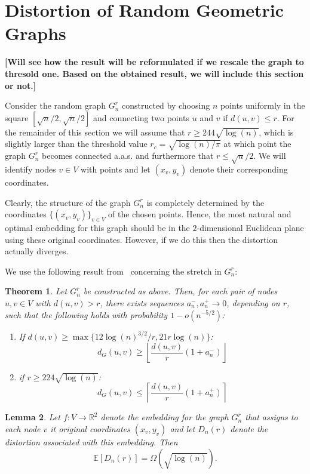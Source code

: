 \documentclass{article}
\newtheorem{theorem}{Theorem}[section]
\newtheorem{lemma}[theorem]{Lemma}
\begin{document}
\section{Distortion of Random Geometric Graphs}

\textbf{[Will see how the result will be reformulated if we rescale the graph to thresold one. Based on the obtained result, we will include this section or not.]}

Consider the random graph $G_n^r$ constructed by choosing $n$ points uniformly in the square $[\sqrt{n}/2, \sqrt{n}/2]$ and connecting two points $u$ and $v$ if $d(u,v) \le r$. For the remainder of this section we will assume that $r \ge 244 \sqrt{\log(n)}$, which is slightly larger than the threshold value $r_c = \sqrt{\log(n)/\pi}$ at which point the graph $G_n^r$ becomes connected a.a.s. and furthermore that $r \le \sqrt{n}/2$. We will identify nodes $v \in V$ with points and let $(x_v,y_v)$ denote their corresponding coordinates.

Clearly, the structure of the graph $G_n^r$ is completely determined by the coordinates $\{(x_v,y_v)\}_{v \in V}$ of the chosen points. Hence, the most natural and optimal embedding for this graph should be in the $2$-dimensional Euclidean plane using these original coordinates. However, if we do this then the distortion actually diverges.

We use the following result from~\citep{diaz2016relation} concerning the stretch in $G_n^r$:

\begin{theorem}\label{thm:stretch_rgg}
Let $G_n^r$ be constructed as above. Then, for each pair of nodes $u,v \in V$ with $d(u, v) > r$, there exists sequences $a_n^-, a_n^+ \to 0$, depending on $r$, such that the following holds with probability $1 - o(n^{-5/2})$:
\begin{enumerate}
\item If $d(u,v) \ge \max\{12\log(n)^{3/2}/r, 21 r \log(n)\}$:
\[
	d_G(u,v) \ge \left\lfloor \frac{d(u,v)}{r}\left(1 + a_n^-\right)\right\rfloor
\]
\item if $r \ge 224 \sqrt{\log(n)}$:
\[
	d_G(u,v) \le \left\lceil \frac{d(u,v)}{r}\left(1 + a_n^+\right)\right\rceil
\]
\end{enumerate}
\end{theorem}

\begin{lemma}
Let $f : V \to \mathbb{R}^2$ denote the embedding for the graph $G_n^r$ that assigns to each node $v$ it original coordinates $(x_v,y_v)$ and let $D_n(r)$ denote the distortion associated with this embedding. Then
\[
	\mathbb{E}[D_n(r)] = \Omega\left(\sqrt{\log(n)}\right).
\]
\end{lemma}
\end{document}

